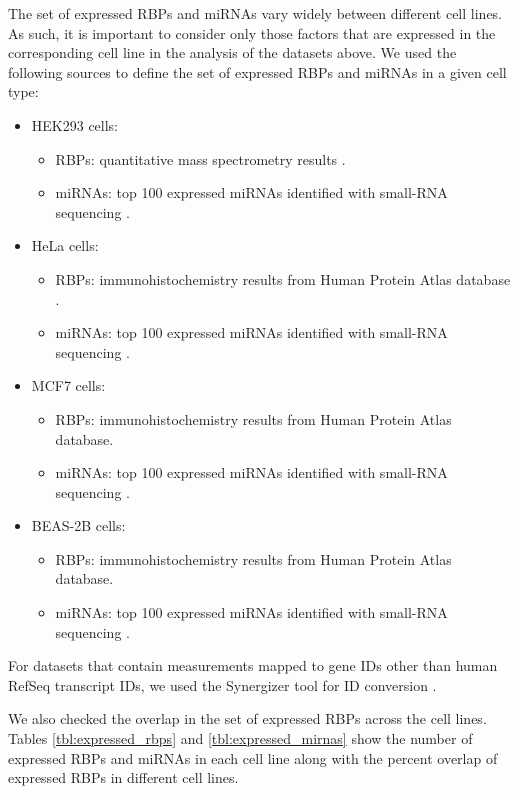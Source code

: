 The set of expressed RBPs and miRNAs vary widely between different cell lines. As such, it is important to consider only those factors that are expressed in the corresponding cell line in the analysis of  the datasets above. We used the following sources to define the set of expressed RBPs and miRNAs in a given cell type:
\begin{itemize}
\item HEK293 cells: 
\begin{itemize}
\item RBPs: quantitative mass spectrometry results  \cite{baltz_12}.
\item miRNAs: top 100 expressed miRNAs identified with small-RNA sequencing \cite{hafner_10}.
\end{itemize}
\item HeLa cells:
\begin{itemize}
\item RBPs: immunohistochemistry results from Human Protein Atlas database \cite{proteinatlas}.
\item miRNAs: top 100 expressed miRNAs identified with small-RNA sequencing \cite{lebedeva_11}.
\end{itemize}
\item MCF7 cells:
\begin{itemize}
\item RBPs: immunohistochemistry results from Human Protein Atlas database.
\item miRNAs: top 100 expressed miRNAs identified with small-RNA sequencing \cite{anbalagan_14}.
\end{itemize}
\item BEAS-2B cells:
\begin{itemize}
\item RBPs: immunohistochemistry results from Human Protein Atlas database.
\item miRNAs:  top 100 expressed miRNAs identified with small-RNA sequencing \cite{zhao_14}.
\end{itemize}
\end{itemize}

For datasets that contain measurements mapped to gene IDs other than human RefSeq transcript IDs, we used the Synergizer tool for ID conversion \cite{synergizer}. 

We also checked the overlap in the set of expressed RBPs across the cell lines. Tables \ref{tbl:expressed_rbps} and \ref{tbl:expressed_mirnas} show the number of expressed RBPs and miRNAs in each cell line along with the percent overlap of expressed RBPs in different cell lines.
\hfill

